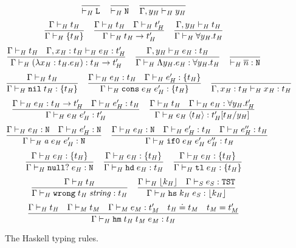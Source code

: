 \begin{figure}[p]
\setlength{\belowcaptionskip}{0pt}
\caption{The Haskell typing rules.}
\[
\frac
{}
{ \vdash_{\mathit{H}} \mathtt{L}}
\quad
\frac
{}
{ \vdash_{\mathit{H}} \mathtt{N}}
\quad
\frac
{}
{\Gamma , y_{\mathit{H}} \vdash_{\mathit{H}} y_{\mathit{H}}}
\]
\[
\frac
{\Gamma \vdash_{\mathit{H}} t_{\mathit{H}}}
{\Gamma \vdash_{\mathit{H}} \lbrace t_{\mathit{H}} \rbrace}
\quad
\frac
{\Gamma \vdash_{\mathit{H}} t_{\mathit{H}} \quad \Gamma \vdash_{\mathit{H}} t_{\mathit{H}}'}
{\Gamma \vdash_{\mathit{H}} t_{\mathit{H}} \rightarrow t_{\mathit{H}}'}
\quad
\frac
{\Gamma, y_{\mathit{H}} \vdash_{\mathit{H}} t_{\mathit{H}}}
{\Gamma \vdash_{\mathit{H}} \forall y_{\mathit{H}} . t_{\mathit{H}}}
\]
\bigskip
\[
\frac
{\Gamma \vdash_{\mathit{H}} t_{\mathit{H}} \quad \Gamma , x_{\mathit{H}} : t_{\mathit{H}} \vdash_{\mathit{H}} e_{\mathit{H}} : t_{\mathit{H}}'}
{\Gamma \vdash_{\mathit{H}} (\lambda x_{\mathit{H}} : t_{\mathit{H}} . e_{\mathit{H}}) : t_{\mathit{H}} \rightarrow t_{\mathit{H}}'}
\quad
\frac
{\Gamma , y_{\mathit{H}} \vdash_{\mathit{H}} e_{\mathit{H}} : t_{\mathit{H}}}
{\Gamma \vdash_{\mathit{H}} \Lambda y_{\mathit{H}} . e_{\mathit{H}} : \forall y_{\mathit{H}} . t_{\mathit{H}}}
\quad
\frac
{}
{ \vdash_{\mathit{H}} \overline{n} : \mathtt{N}}
\]
\[
\frac
{\Gamma \vdash_{\mathit{H}} t_{\mathit{H}}}
{\Gamma \vdash_{\mathit{H}} \mathtt{nil} \; t_{\mathit{H}} : \lbrace t_{\mathit{H}} \rbrace}
\quad
\frac
{\Gamma \vdash_{\mathit{H}} e_{\mathit{H}} : t_{\mathit{H}} \quad \Gamma \vdash_{\mathit{H}} e_{\mathit{H}}' : \lbrace t_{\mathit{H}} \rbrace}
{\Gamma \vdash_{\mathit{H}} \mathtt{cons} \; e_{\mathit{H}} \; e_{\mathit{H}}' : \lbrace t_{\mathit{H}} \rbrace}
\quad
\frac
{}
{\Gamma , x_{\mathit{H}} : t_{\mathit{H}} \vdash_{\mathit{H}} x_{\mathit{H}} : t_{\mathit{H}}}
\]
\[
\frac
{\Gamma \vdash_{\mathit{H}} e_{\mathit{H}} : t_{\mathit{H}} \rightarrow t_{\mathit{H}}' \quad \Gamma \vdash_{\mathit{H}} e_{\mathit{H}}' : t_{\mathit{H}}}
{\Gamma\vdash_{\mathit{H}}e_{\mathit{H}} \; e_{\mathit{H}}':t_{\mathit{H}}'}
\quad
\frac
{\Gamma \vdash_{\mathit{H}} t_{\mathit{H}} \quad \Gamma \vdash_{\mathit{H}} e_{\mathit{H}} : \forall y_{\mathit{H}} . t_{\mathit{H}}'}
{\Gamma \vdash_{\mathit{H}} e_{\mathit{H}} \; \langle t_{\mathit{H}} \rangle : t_{\mathit{H}}'[t_{\mathit{H}}/y_{\mathit{H}}]}
\]
\[
\frac
{\Gamma \vdash_{\mathit{H}} e_{\mathit{H}} : \mathtt{N} \quad \Gamma \vdash_{\mathit{H}} e_{\mathit{H}}' : \mathtt{N}}
{\Gamma \vdash_{\mathit{H}} \mathit{a} \; e_{\mathit{H}} \; e_{\mathit{H}}' : \mathtt{N}}
\quad
\frac
{\Gamma \vdash_{\mathit{H}} e_{\mathit{H}} : \mathtt{N} \quad \Gamma \vdash_{\mathit{H}} e_{\mathit{H}}' : t_{\mathit{H}} \quad \Gamma \vdash_{\mathit{H}} e_{\mathit{H}}'' : t_{\mathit{H}}}
{\Gamma \vdash_{\mathit{H}} \mathtt{if0} \; e_{\mathit{H}} \; e_{\mathit{H}}' \; e_{\mathit{H}}'' : t_{\mathit{H}}}
\]
\[
\frac
{\Gamma \vdash_{\mathit{H}} e_{\mathit{H}} : \lbrace t_{\mathit{H}} \rbrace}
{\Gamma \vdash_{\mathit{H}} \mathtt{null?} \; e_{\mathit{H}} : \mathtt{N}}
\quad
\frac
{\Gamma \vdash_{\mathit{H}} e_{\mathit{H}} : \lbrace t_{\mathit{H}} \rbrace}
{\Gamma \vdash_{\mathit{H}} \mathtt{hd} \; e_{\mathit{H}} : t_{\mathit{H}}}
\quad
\frac
{\Gamma \vdash_{\mathit{H}} e_{\mathit{H}} : \lbrace t_{\mathit{H}} \rbrace}
{\Gamma \vdash_{\mathit{H}} \mathtt{tl} \; e_{\mathit{H}} : \lbrace t_{\mathit{H}} \rbrace}
\]
\[
\frac
{\Gamma \vdash_{\mathit{H}} t_{\mathit{H}}}
{\Gamma \vdash_{\mathit{H}} \mathtt{wrong} \; t_{\mathit{H}} \; \mathit{string} : t_{\mathit{H}}}
\quad
\frac
{\Gamma \vdash_{\mathit{H}} \lfloor k_{\mathit{H}} \rfloor \quad \Gamma \vdash_{\mathit{S}} e_{\mathit{S}} : \mathtt{TST}}
{\Gamma \vdash_{\mathit{H}} \mathtt{hs} \; k_{\mathit{H}} \; e_{\mathit{S}} : \lfloor k_{\mathit{H}} \rfloor}
\]
\[
\frac
{\Gamma \vdash_{\mathit{H}} t_{\mathit{H}} \quad \Gamma \vdash_{\mathit{M}} t_{\mathit{M}} \quad \Gamma \vdash_{\mathit{M}} e_{\mathit{M}} : t_{\mathit{M}}' \quad t_{\mathit{H}} \doteq t_{\mathit{M}} \quad t_{\mathit{M}} = t_{\mathit{M}}'}
{\Gamma \vdash_{\mathit{H}} \mathtt{hm} \; t_{\mathit{H}} \; t_{\mathit{M}} \; e_{\mathit{M}} : t_{\mathit{H}}}
\]
\label{fightr}
\end{figure}